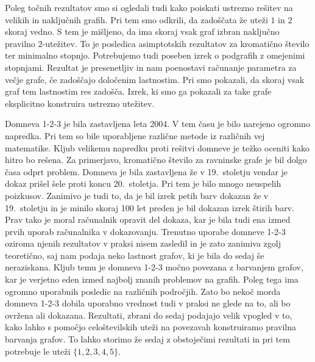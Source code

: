 \documentclass[12pt,a4paper,twoside]{article}
\newcommand{\literatura}{literatura}  %
\theoremstyle{definition} %
\theoremstyle{plain} %
\numberwithin{equation}{section}  %
\begin{document}
Poleg točnih rezultatov smo si ogledali tudi kako poiskati ustrezno rešitev na velikih in naključnih grafih. Pri tem smo odkrili, da zadoščata že uteži $1$ in $2$ skoraj vedno. S tem je mišljeno, da ima skoraj vsak graf izbran naključno pravilno $2$-utežitev. To je posledica asimptotskih rezultatov za kromatično število ter minimalno stopnjo. Potrebujemo tudi poseben izrek o podgrafih z omejenimi stopnjami. Rezultat je presenetljiv in nam poenostavi računanje parametra za večje grafe, če zadoščajo določenim lastnostim. Pri smo pokazali, da skoraj vsak graf tem lastnostim res zadošča. Izrek, ki smo ga pokazali za take grafe eksplicitno konstruira ustrezno utežitev.

Domneva 1-2-3 je bila zastavljena leta 2004. V tem času je bilo narejeno ogromno napredka. Pri tem so bile uporabljene različne metode iz različnih vej matematike. Kljub velikemu napredku proti rešitvi domneve je težko oceniti kako hitro bo rešena. Za primerjavo, kromatično število za ravninske grafe je bil dolgo časa odprt problem. Domneva je bila zastavljena že v 19.\ stoletju vendar je dokaz prišel šele proti koncu 20.\ stoletja. Pri tem je bilo mnogo neuspelih poizkusov. Zanimivo je tudi to, da je bil izrek petih barv dokazan že v 19.\ stoletju in je minilo skoraj 100 let preden je bil dokazan izrek štirih barv. Prav tako je moral računalnik opravit del dokaza, kar je bila tudi ena izmed prvih uporab računalnika v dokazovanju. Trenutno uporabe domneve 1-2-3 oziroma njenih rezultatov v praksi nisem zasledil in je zato zanimiva zgolj teoretično, saj nam podaja neko lastnost grafov, ki je bila do sedaj še neraziskana. Kljub temu je domneva 1-2-3 močno povezana z barvanjem grafov, kar je verjetno eden izmed najbolj znanih problemov na grafih. Poleg tega ima ogromno uporabnih posledic na različnih področjih. Zato bo nekoč morda domneva 1-2-3 dobila uporabno vrednost tudi v praksi ne glede na to, ali bo ovržena ali dokazana. Rezultati, zbrani do sedaj podajajo velik vpogled v to, kako lahko s pomočjo celoštevilskih uteži na povezavah konstruiramo pravilna barvanja grafov. To lahko storimo že sedaj z obstoječimi rezultati in pri tem potrebuje le uteži $\{1,2,3,4,5\}$.


 
\cleardoublepage                           %

\cleardoublepage                           %
\printindex
\end{document}
